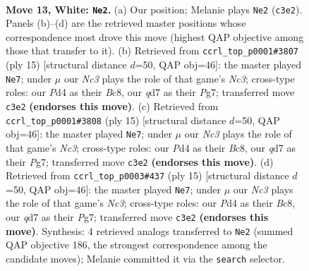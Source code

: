 \documentclass[11pt]{article}
\begin{document}
\clearpage

\begin{figure}[p]\centering
\begin{subfigure}{0.46\textwidth}\centering
\resizebox{\linewidth}{!}{%
\newchessgame
\chessboard[
  setfen={rnb2kr1/1p1qbp1p/p3p1p1/2Pp3n/3P4/1NN5/PP3PPP/1RBQKB1R w - - 2 13},
  showmover=false,
  pgfstyle=straightmove, color=movearrow, markmove={c3-e2}
]}
\caption{}
\end{subfigure}\hfill
\begin{subfigure}{0.46\textwidth}\centering
\resizebox{\linewidth}{!}{%
\newchessgame
\chessboard[
  setfen={r1bqkb1r/ppp2ppp/2n2n2/3p4/3P1N2/P1N1P3/1P3PPP/R1BQKB1R b KQkq - 1 8},
  showmover=false,
  pgfstyle=straightmove, color=movearrow, markmove={c6-e7}
]}
\caption{}
\end{subfigure}
\\[4pt]
\begin{subfigure}{0.46\textwidth}\centering
\resizebox{\linewidth}{!}{%
\newchessgame
\chessboard[
  setfen={r1bqkb1r/ppp2ppp/2n2n2/3p4/3P1N2/P1N1P3/1P3PPP/R1BQKB1R b KQkq - 1 8},
  showmover=false,
  pgfstyle=straightmove, color=movearrow, markmove={c6-e7}
]}
\caption{}
\end{subfigure}\hfill
\begin{subfigure}{0.46\textwidth}\centering
\resizebox{\linewidth}{!}{%
\newchessgame
\chessboard[
  setfen={r1bqkb1r/ppp2ppp/2n2n2/3p4/3P1N2/P1N1P3/1P3PPP/R1BQKB1R b KQkq - 1 8},
  showmover=false,
  pgfstyle=straightmove, color=movearrow, markmove={c6-e7}
]}
\caption{}
\end{subfigure}
\caption{\textbf{Move 13, White: \texttt{Ne2}.} (a) Our position; Melanie plays \texttt{Ne2} (\texttt{c3e2}). Panels (b)--(d) are the retrieved master positions whose correspondence most drove this move (highest QAP objective among those that transfer to it). (b) Retrieved from \texttt{ccrl\_top\_p0001\#3807} (ply 15) [structural distance $d$=50, QAP obj=46]: the master played \texttt{Ne7}; under $\mu$ our \emph{Nc3} plays the role of that game's \emph{Nc3}; cross-type roles: our \emph{P}d4 as their \emph{B}c8, our \emph{q}d7 as their \emph{P}g7; transferred move \texttt{c3e2} \textbf{(endorses this move)}. (c) Retrieved from \texttt{ccrl\_top\_p0001\#3808} (ply 15) [structural distance $d$=50, QAP obj=46]: the master played \texttt{Ne7}; under $\mu$ our \emph{Nc3} plays the role of that game's \emph{Nc3}; cross-type roles: our \emph{P}d4 as their \emph{B}c8, our \emph{q}d7 as their \emph{P}g7; transferred move \texttt{c3e2} \textbf{(endorses this move)}. (d) Retrieved from \texttt{ccrl\_top\_p0003\#437} (ply 15) [structural distance $d$=50, QAP obj=46]: the master played \texttt{Ne7}; under $\mu$ our \emph{Nc3} plays the role of that game's \emph{Nc3}; cross-type roles: our \emph{P}d4 as their \emph{B}c8, our \emph{q}d7 as their \emph{P}g7; transferred move \texttt{c3e2} \textbf{(endorses this move)}. Synthesis: 4 retrieved analogs transferred to \texttt{Ne2} (summed QAP objective 186, the strongest correspondence among the candidate moves); Melanie committed it via the \texttt{search} selector.}
\label{fig:thought-m24}
\end{figure}
\end{document}
